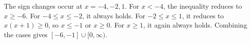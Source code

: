 The sign changes occur at $x=-4,-2,1$. For $x<-4$, the inequality reduces to $x\ge-6$. For $-4\le x\le-2$, it always holds. For $-2\le x\le1$, it reduces to $x(x+1)\ge0$, so $x\le-1$ or $x\ge0$. For $x\ge1$, it again always holds. Combining the cases gives $\boxed{[-6,-1]\cup[0,\infty)}$.
